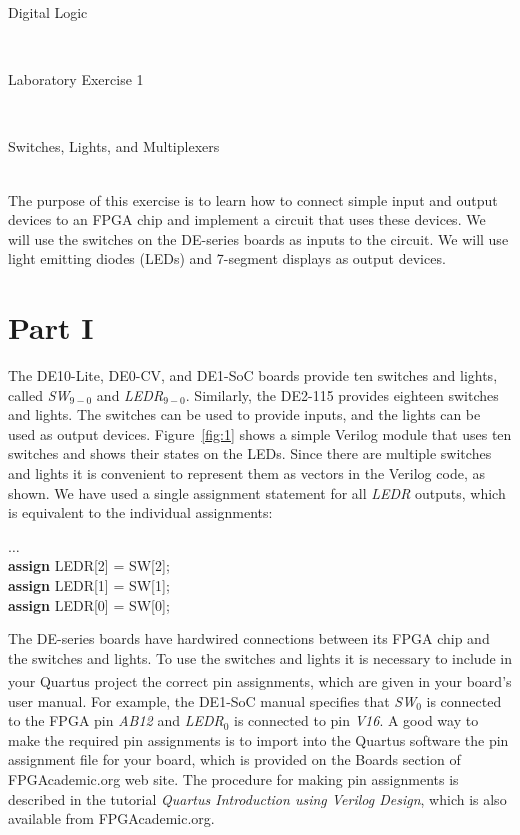 \documentclass[epsfig,10pt,fullpage]{article}
\newcommand{\LabNum}{1}
\begin{document}
\centerline{\huge Digital Logic}
~\\
\centerline{\huge Laboratory Exercise \LabNum}
~\\
\centerline{\large Switches, Lights, and Multiplexers}
~\\

The purpose of this exercise is to learn how to connect simple input and
output devices to an FPGA chip and implement a circuit that uses these devices.
We will use the switches on the DE-series boards as inputs to the circuit.
We will use light emitting diodes (LEDs) and 7-segment displays as output
devices.

\section*{Part I}
The DE10-Lite, DE0-CV, and DE1-SoC boards provide ten switches and lights, called 
{\it SW}$_{9-0}$ and {\it LEDR}$_{9-0}$. Similarly, the DE2-115 provides eighteen switches 
and lights. The switches can be used to provide inputs, and the lights can be used as 
output devices. Figure~\ref{fig:1} shows a simple Verilog module that uses ten switches 
and shows their states on the LEDs. Since there are multiple switches and lights
it is convenient to represent them as vectors in the Verilog code, as shown. We have used a
single assignment statement for all {\it LEDR} outputs, which is equivalent to the 
individual assignments:

\begin{center}
\begin{minipage}[t]{12.5 cm}
\begin{tabbing}
$\ldots$\\
{\bf assign} LEDR[2] = SW[2];\\
{\bf assign} LEDR[1] = SW[1];\\
{\bf assign} LEDR[0] = SW[0];
\end{tabbing}
\end{minipage}
\end{center}

The DE-series boards have hardwired connections between its FPGA chip and the switches and
lights. To use the switches and lights it is necessary to include in
your Quartus\textsuperscript{\textregistered} project the correct pin assignments, which are 
given in your board's user manual. For example, the DE1-SoC manual specifies that 
{\it SW}$_0$ is connected to the FPGA pin {\it AB12} and {\it LEDR}$_0$ is connected to 
pin {\it V16}. A good way to make the required pin assignments is to import into the 
Quartus software the pin assignment file for your board, which is provided on the 
Boards section of FPGAcademic.org web site. The procedure for making pin assignments is 
described in the tutorial {\it Quartus Introduction using Verilog Design}, which is 
also available from FPGAcademic.org.
~\\
\end{document}
